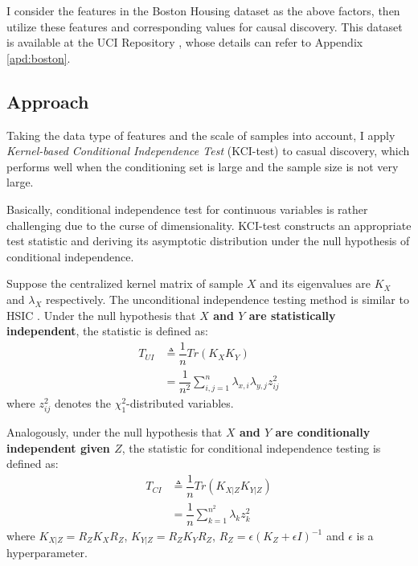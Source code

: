 \documentclass[12pt,a4paper]{article}
\theoremstyle{definition}
\begin{document}
\vspace{0.008\linewidth}
I consider the features in the Boston Housing dataset as the above factors, then utilize these features and corresponding values for causal discovery. This dataset is available at the UCI Repository \cite{boston}, whose details can refer to Appendix \ref{apd:boston}.

\subsection{Approach}
\label{sec:appro}

Taking the data type of features and the scale of samples into account, I apply \textit{Kernel-based Conditional Independence Test} (KCI-test) \cite{alg} to casual discovery, which performs well when the conditioning set is large and the sample size is not very large.

\vspace{0.008\linewidth}
Basically, conditional independence test for continuous variables is rather challenging due to the curse of dimensionality. KCI-test constructs an appropriate test statistic and deriving its asymptotic distribution under the null hypothesis of conditional independence.

\vspace{0.008\linewidth}
Suppose the centralized kernel matrix of sample $X$ and its eigenvalues are $K_X$ and $\lambda_X$ respectively. The unconditional independence testing method is similar to HSIC \cite{HSIC}. Under the null hypothesis that \textbf{$X$ and $Y$ are statistically independent}, the statistic is defined as:
\begin{align*}
	T_{UI} & \triangleq \dfrac{1}{n}Tr(K_{X}K_{Y}) \\
	& = \dfrac{1}{n^2}\sum_{i,j=1}^{n}\lambda_{x,i}\lambda_{y,j}z^2_{ij}
\end{align*}
where $z^2_{ij}$ denotes the $\chi^2_1$-distributed variables.

\vspace{0.008\linewidth}
Analogously, under the null hypothesis that \textbf{$X$ and $Y$ are conditionally independent given $Z$}, the statistic for conditional independence testing is defined as:
\begin{align*}
	T_{CI} & \triangleq \dfrac{1}{n}Tr(K_{X|Z}K_{Y|Z}) \\
	& = \dfrac{1}{n}\sum_{k=1}^{n^2}\lambda_{k}z^2_{k}
\end{align*}
where $K_{X|Z}=R_ZK_XR_Z$, $K_{Y|Z}=R_ZK_YR_Z$, $R_Z=\epsilon(K_Z+\epsilon I)^{-1}$ and $\epsilon$ is a hyperparameter.
\end{document}
